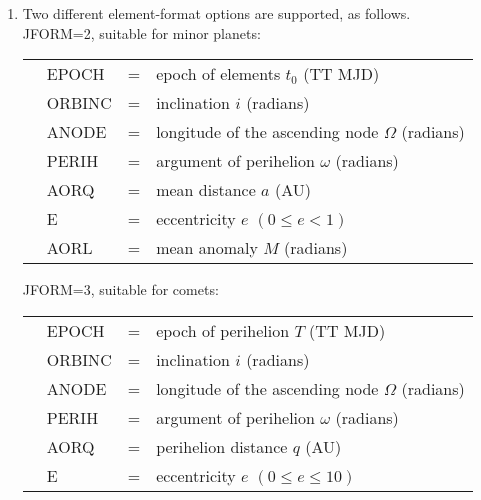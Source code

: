 \documentclass[11pt,twoside,nolof]{starlink}
\begin{document}
{
 \begin{enumerate}
  \item Two different element-format options are supported, as follows. \\

        JFORM=2, suitable for minor planets:

        \begin{tabular}{llll}
        & EPOCH  & = & epoch of elements $t_0$ (TT MJD) \\
        & ORBINC & = & inclination $i$ (radians) \\
        & ANODE  & = & longitude of the ascending node $\Omega$ (radians) \\
        & PERIH  & = & argument of perihelion $\omega$ (radians) \\
        & AORQ   & = & mean distance $a$ (AU) \\
        & E      & = & eccentricity $e$ $( 0 \leq e < 1 )$ \\
        & AORL   & = & mean anomaly $M$ (radians)
        \end{tabular}

        JFORM=3, suitable for comets:

        \begin{tabular}{llll}
        & EPOCH  & = & epoch of perihelion $T$ (TT MJD) \\
        & ORBINC & = & inclination $i$ (radians) \\
        & ANODE  & = & longitude of the ascending node $\Omega$ (radians) \\
        & PERIH  & = & argument of perihelion $\omega$ (radians) \\
        & AORQ   & = & perihelion distance $q$ (AU) \\
        & E      & = & eccentricity $e$ $( 0 \leq e \leq 10 )$
        \end{tabular}


\end{enumerate}}
\end{document}
